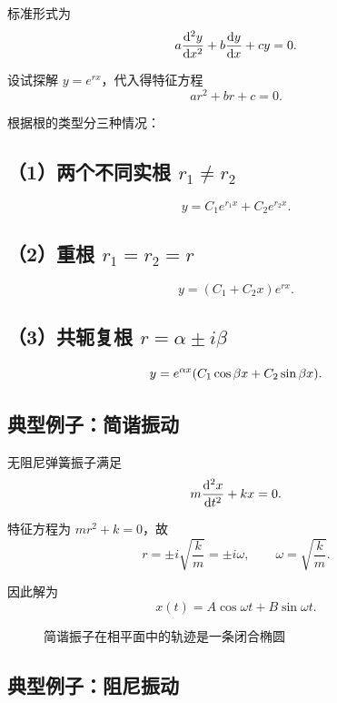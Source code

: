 标准形式为
\[
 a\dv[2]{y}{x}+b\dv{y}{x}+cy=0.
\]

设试探解 $y=e^{rx}$，代入得特征方程
\[
 ar^2+br+c=0.
\]

根据根的类型分三种情况：

\subsection*{（1）两个不同实根 $r_1\neq r_2$}
\[
 y=C_1 e^{r_1 x}+C_2 e^{r_2 x}.
\]

\subsection*{（2）重根 $r_1=r_2=r$}
\[
 y=(C_1+C_2 x)e^{rx}.
\]

\subsection*{（3）共轭复根 $r=\alpha\pm i\beta$}
\[
 y=e^{\alpha x}\qty(C_1\cos\beta x+C_2\sin\beta x).
\]

\subsection*{典型例子：简谐振动}

无阻尼弹簧振子满足
\[
 m\dv[2]{x}{t}+kx=0.
\]

特征方程为 $mr^2+k=0$，故
\[
 r=\pm i\sqrt{\frac{k}{m}}=\pm i\omega,
\qquad
\omega=\sqrt{\frac{k}{m}}.
\]

因此解为
\[
 x(t)=A\cos \omega t+B\sin \omega t.
\]

\begin{figure}[htbp]
\centering
{}
\caption{简谐振子在相平面中的轨迹是一条闭合椭圆}
\end{figure}

\subsection*{典型例子：阻尼振动}

